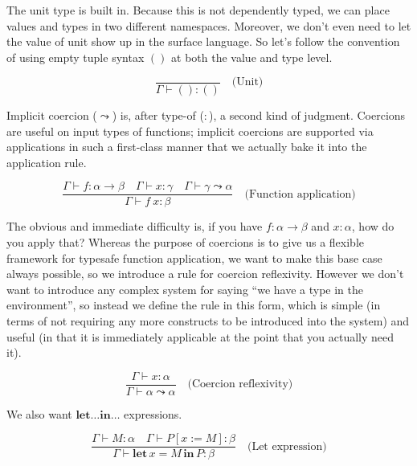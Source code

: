 \documentclass{article}
\begin{document}
The unit type is built in. Because this is not dependently typed, we can place
values and types in two different namespaces. Moreover, we don't even need to
let the value of unit show up in the surface language. So let's follow the
convention of using empty tuple syntax $()$ at both the value and type level.

\[ \frac{}{\Gamma\vdash()\mathbin{:}()}\quad\text{(Unit)} \]

Implicit coercion ($\leadsto$) is, after type-of ($:$), a second kind of
judgment. Coercions are useful on input types of functions; implicit coercions
are supported via applications in such a first-class manner that we actually
bake it into the application rule.

\[ \frac{\Gamma\vdash f\mathbin{:}\alpha\to\beta\quad\Gamma\vdash x\mathbin{:}\gamma\quad\Gamma\vdash \gamma\leadsto\alpha}{\Gamma\vdash f~x\mathbin{:}\beta}\quad\text{(Function application)} \]

The obvious and immediate difficulty is, if you have
$f\mathbin{:}\alpha\to\beta$ and $x\mathbin{:}\alpha$, how do you apply that?
Whereas the purpose of coercions is to give us a flexible framework for typesafe
function application, we want to make this base case always possible, so we
introduce a rule for coercion reflexivity. However we don't want to introduce
any complex system for saying ``we have a type in the environment'', so instead
we define the rule in this form, which is simple (in terms of not requiring any
more constructs to be introduced into the system) and useful (in that it is
immediately applicable at the point that you actually need it).

\[ \frac{\Gamma\vdash x\mathbin{:}\alpha}{\Gamma\vdash \alpha\leadsto\alpha}\quad\text{(Coercion reflexivity)} \]

We also want $\textbf{let}\dots\textbf{in}\dots$ expressions.

\[ \frac{\Gamma\vdash M\mathbin{:}\alpha\quad\Gamma\vdash
    P[x:=M]\mathbin{:}\beta}{\Gamma\vdash \textbf{let}\, x = M \,\textbf{in}\, P\mathbin{:}\beta}\quad\text{(Let expression)} \]

\end{document}
